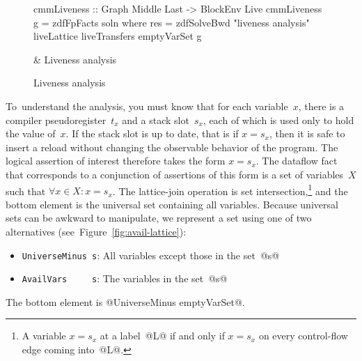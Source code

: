 \documentclass[blockstyle,preprint,nocopyrightspace]{sigplanconf}
\newcommand\slotof[1]{\ensuremath{s_{#1}}}
\newcommand\tempof[1]{\ensuremath{t_{#1}}}
\newcommand{\authornote}[1]{{\em #1}}
\def\authornote#1{\unskip\relax}
\newcommand{\norman}[1]{\authornote{NR: #1}}
\let\remark\norman
\newcommand\figref[1]{Figure~\ref{fig:#1}}
\newcommand\figlabel[1]{\label{fig:#1}}
\begin{document}
\begin{figure*}
\begin{codetable}
\T\begin{code}
cmmLiveness :: Graph Middle Last -> BlockEnv Live
cmmLiveness g = zdfFpFacts soln
    where res = zdfSolveBwd "liveness analysis" liveLattice liveTransfers emptyVarSet g
\end{code}\B
& Liveness \mbox{analysis}\\
\end{codetable}
\caption{Liveness analysis}
\figlabel{liveness-all}
\figlabel{liveness}
\figlabel{live-lattice}
\figlabel{live-transfers}
\figlabel{live-running}
\end{figure*}
%
%



To~understand the analysis, you must know that for each variable~$x$,
there is a compiler pseudoregister~\tempof x and a stack slot~\slotof x, each of
which is used only to hold the value of~$x$.
%
\remark{Changing ``register'' to
``variable'' makes the example easier to understand and hides a
GHC-ism, but there's a slippery slope here\ldots}
%
If the stack slot is up to date, that is if $x = \slotof x$,
then it is safe to insert a reload without changing the observable
behavior of the program.
The logical assertion of interest therefore takes the form $x = \slotof x$.
The dataflow fact that corresponds to a conjunction of assertions of
this form is a set of variables~$X$ such that $\forall x \in X \mathrel
: x = \slotof x$.
The lattice-join operation is set intersection,\footnote
{A variable $x = \slotof x$ at a label~@L@ if and
only if $x = \slotof x$ on every control-flow edge coming into~@L@.}
and the bottom element
is the universal set containing all variables.
Because universal sets can be awkward to manipulate, we represent a
set using one of two alternatives
(see~\figref{avail-lattice}):
\begin{itemize}
\item \texttt{UniverseMinus~s}: All variables except those in the set~@s@
\item \texttt{AvailVars~~~~~s}: The variables in the set~@s@
\end{itemize}
The bottom element is @UniverseMinus emptyVarSet@.




\end{document}
